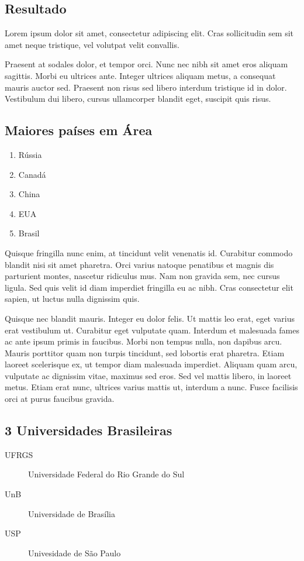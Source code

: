 \begin{center}
  \section{Resultado}
  Lorem ipsum dolor sit amet, consectetur adipiscing elit. Cras sollicitudin sem sit amet neque tristique, vel volutpat velit convallis.    
\end{center}

Praesent at sodales dolor, et tempor orci. Nunc nec nibh sit amet eros aliquam sagittis. Morbi eu ultrices ante. Integer ultrices aliquam metus, a consequat mauris auctor sed. Praesent non risus sed libero interdum tristique id in dolor. Vestibulum dui libero, cursus ullamcorper blandit eget, suscipit quis risus.

\subsection*{Maiores países em Área}
\begin{enumerate}
    \item Rússia
    \item Canadá
    \item China
    \item EUA
    \item Brasil
\end{enumerate}

Quisque fringilla nunc enim, at tincidunt velit venenatis id. Curabitur commodo blandit nisi sit amet pharetra. Orci varius natoque penatibus et magnis dis parturient montes, nascetur ridiculus mus. Nam non gravida sem, nec cursus ligula. Sed quis velit id diam imperdiet fringilla eu ac nibh. Cras consectetur elit sapien, ut luctus nulla dignissim quis.

Quisque nec blandit mauris. Integer eu dolor felis. Ut mattis leo erat, eget varius erat vestibulum ut. Curabitur eget vulputate quam. Interdum et malesuada fames ac ante ipsum primis in faucibus. Morbi non tempus nulla, non dapibus arcu. Mauris porttitor quam non turpis tincidunt, sed lobortis erat pharetra. Etiam laoreet scelerisque ex, ut tempor diam malesuada imperdiet. Aliquam quam arcu, vulputate ac dignissim vitae, maximus sed eros. Sed vel mattis libero, in laoreet metus. Etiam erat nunc, ultrices varius mattis ut, interdum a nunc. Fusce facilisis orci at purus faucibus gravida.

\subsection*{3 Universidades Brasileiras}
\begin{description}
    \item[UFRGS] Universidade Federal do Rio Grande do Sul
    \item[UnB] Universidade de Brasília
    \item[USP] Univesidade de São Paulo
\end{description}

